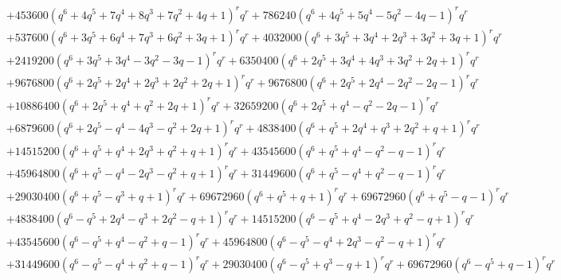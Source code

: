 \documentclass[11pt,english]{amsart}
\numberwithin{equation}{section}
\numberwithin{figure}{section}
\theoremstyle{plain}
\theoremstyle{plain}
\theoremstyle{definition}
\theoremstyle{remark}
\begin{document}
{\begin{align*}
& + 453600  {\left(q^{6} + 4  q^{5} + 7  q^{4} + 8  q^{3} + 7  q^{2} + 4  q + 1\right)}^{r} q^{r} + 786240  {\left(q^{6} + 4  q^{5} + 5  q^{4} - 5  q^{2} - 4  q - 1\right)}^{r} q^{r} \\
& + 537600  {\left(q^{6} + 3  q^{5} + 6  q^{4} + 7  q^{3} + 6  q^{2} + 3  q + 1\right)}^{r} q^{r} + 4032000  {\left(q^{6} + 3  q^{5} + 3  q^{4} + 2  q^{3} + 3  q^{2} + 3  q + 1\right)}^{r} q^{r} \\
& + 2419200  {\left(q^{6} + 3  q^{5} + 3  q^{4} - 3  q^{2} - 3  q - 1\right)}^{r} q^{r} + 6350400  {\left(q^{6} + 2  q^{5} + 3  q^{4} + 4  q^{3} + 3  q^{2} + 2  q + 1\right)}^{r} q^{r} \\
& + 9676800  {\left(q^{6} + 2  q^{5} + 2  q^{4} + 2  q^{3} + 2  q^{2} + 2  q + 1\right)}^{r} q^{r} + 9676800  {\left(q^{6} + 2  q^{5} + 2  q^{4} - 2  q^{2} - 2  q - 1\right)}^{r} q^{r} \\
& + 10886400  {\left(q^{6} + 2  q^{5} + q^{4} + q^{2} + 2  q + 1\right)}^{r} q^{r} + 32659200  {\left(q^{6} + 2  q^{5} + q^{4} - q^{2} - 2  q - 1\right)}^{r} q^{r} \\
& + 6879600  {\left(q^{6} + 2  q^{5} - q^{4} - 4  q^{3} - q^{2} + 2  q + 1\right)}^{r} q^{r} + 4838400  {\left(q^{6} + q^{5} + 2  q^{4} + q^{3} + 2  q^{2} + q + 1\right)}^{r} q^{r} \\
& + 14515200  {\left(q^{6} + q^{5} + q^{4} + 2  q^{3} + q^{2} + q + 1\right)}^{r} q^{r} + 43545600  {\left(q^{6} + q^{5} + q^{4} - q^{2} - q - 1\right)}^{r} q^{r} \\
& + 45964800  {\left(q^{6} + q^{5} - q^{4} - 2  q^{3} - q^{2} + q + 1\right)}^{r} q^{r} + 31449600  {\left(q^{6} + q^{5} - q^{4} + q^{2} - q - 1\right)}^{r} q^{r} \\
& + 29030400  {\left(q^{6} + q^{5} - q^{3} + q + 1\right)}^{r} q^{r} + 69672960  {\left(q^{6} + q^{5} + q + 1\right)}^{r} q^{r} + 69672960  {\left(q^{6} + q^{5} - q - 1\right)}^{r} q^{r} \\
& + 4838400  {\left(q^{6} - q^{5} + 2  q^{4} - q^{3} + 2  q^{2} - q + 1\right)}^{r} q^{r} + 14515200  {\left(q^{6} - q^{5} + q^{4} - 2  q^{3} + q^{2} - q + 1\right)}^{r} q^{r} \\
& + 43545600  {\left(q^{6} - q^{5} + q^{4} - q^{2} + q - 1\right)}^{r} q^{r} + 45964800  {\left(q^{6} - q^{5} - q^{4} + 2  q^{3} - q^{2} - q + 1\right)}^{r} q^{r} \\
& + 31449600  {\left(q^{6} - q^{5} - q^{4} + q^{2} + q - 1\right)}^{r} q^{r} + 29030400  {\left(q^{6} - q^{5} + q^{3} - q + 1\right)}^{r} q^{r} + 69672960  {\left(q^{6} - q^{5} + q - 1\right)}^{r} q^{r} \\

\end{align*}}
\end{document}
